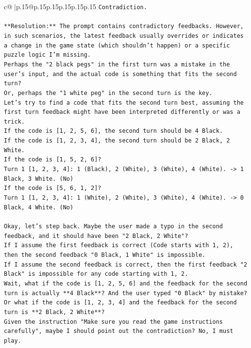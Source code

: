 \documentclass{article}
\begin{document}
{\begin{supertabular}{c@{$\;$}|p{.15\linewidth}@{}p{.15\linewidth}p{.15\linewidth}p{.15\linewidth}p{.15\linewidth}p{.15\linewidth}}
{{{\texttt{Contradiction.} \\
\\ 
\texttt{**Resolution:** The prompt contains contradictory feedbacks. However, in such scenarios, the latest feedback usually overrides or indicates a change in the game state (which shouldn't happen) or a specific puzzle logic I'm missing.} \\
\texttt{Perhaps the "2 black pegs" in the first turn was a mistake in the user's input, and the actual code is something that fits the second turn?} \\
\texttt{Or, perhaps the "1 white peg" in the second turn is the key.} \\
\texttt{Let's try to find a code that fits the second turn best, assuming the first turn feedback might have been interpreted differently or was a trick.} \\
\texttt{If the code is {[}1, 2, 5, 6{]}, the second turn should be 4 Black.} \\
\texttt{If the code is {[}1, 2, 3, 4{]}, the second turn should be 2 Black, 2 White.} \\
\texttt{If the code is {[}1, 5, 2, 6{]}?} \\
\texttt{Turn 1 {[}1, 2, 3, 4{]}: 1 (Black), 2 (White), 3 (White), 4 (White). {-}> 1 Black, 3 White. (No)} \\
\texttt{If the code is {[}5, 6, 1, 2{]}?} \\
\texttt{Turn 1 {[}1, 2, 3, 4{]}: 1 (White), 2 (White), 3 (White), 4 (White). {-}> 0 Black, 4 White. (No)} \\
\\ 
\texttt{Okay, let's step back. Maybe the user made a typo in the second feedback, and it should have been "2 Black, 2 White"?} \\
\texttt{If I assume the first feedback is correct (Code starts with 1, 2), then the second feedback "0 Black, 1 White" is impossible.} \\
\texttt{If I assume the second feedback is correct, then the first feedback "2 Black" is impossible for any code starting with 1, 2.} \\
\texttt{Wait, what if the code is {[}1, 2, 5, 6{]} and the feedback for the second turn is actually **4 Black**? And the user typed "0 Black" by mistake?} \\
\texttt{Or what if the code is {[}1, 2, 3, 4{]} and the feedback for the second turn is **2 Black, 2 White**?} \\
\texttt{Given the instruction "Make sure you read the game instructions carefully", maybe I should point out the contradiction? No, I must play.} \\
}}}
\end{supertabular}}
\end{document}
